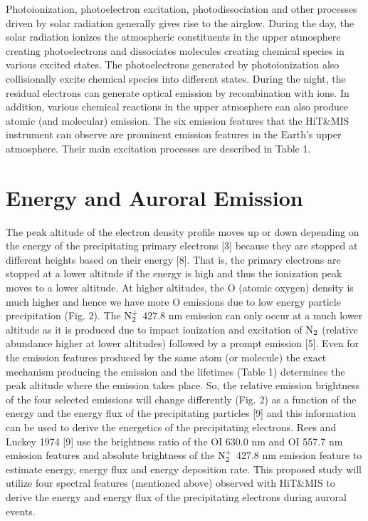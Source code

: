 Photoionization, photoelectron excitation, photodissociation and other processes driven by solar radiation generally gives rise to the airglow. During the day, the solar radiation ionizes the atmospheric constituents in the upper atmosphere creating photoelectrons and dissociates molecules creating chemical species in various excited states. The photoelectrons generated by photoionization also collisionally excite chemical species into different states. During the night, the residual electrons can generate optical emission by recombination with ions. In addition, various chemical reactions in the upper atmosphere can also produce atomic (and molecular) emission. 
The six emission features that the HiT\&MIS instrument can observe are prominent emission features in the Earth’s upper atmosphere. Their main excitation processes are described in Table 1. 

\section{Energy and Auroral Emission}
The peak altitude of the electron density profile moves up or down depending on the energy of the precipitating primary electrons [3] because they are stopped at different heights based on their energy [8]. That is, the primary electrons are stopped at a lower altitude if the energy is high and thus the ionization peak moves to a lower altitude. At higher altitudes, the O (atomic oxygen) density is much higher and hence we have more O emissions due to low energy particle precipitation (Fig. 2). The $\rm N_2^+$ 427.8 nm emission can only occur at a much lower altitude as it is produced due to impact ionization and excitation of $\rm N_2$ (relative abundance higher at lower altitudes) followed by a prompt emission [5]. Even for the emission features produced by the same atom (or molecule) the exact mechanism producing the emission and the lifetimes (Table 1) determines the peak altitude where the emission takes place. So, the relative emission brightness of the four selected emissions will change differently (Fig. 2) as a function of the energy and the energy flux of the precipitating particles [9] and this information can be used to derive the energetics of the precipitating electrons. Rees and Luckey 1974 [9] use the brightness ratio of the OI 630.0 nm and OI 557.7 nm emission features and absolute brightness of the $\rm N_2^+$ 427.8 nm emission feature to estimate energy, energy flux and energy deposition rate. This proposed study will utilize four spectral features (mentioned above) observed with HiT\&MIS to derive the energy and energy flux of the precipitating electrons during auroral events. 



